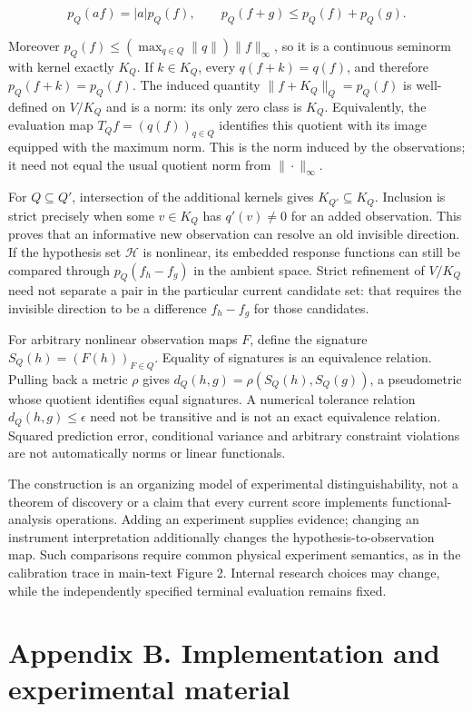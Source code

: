 \documentclass[11pt,a4paper]{article}
\begin{document}
\[
p_Q(af)=|a|p_Q(f),\qquad p_Q(f+g)\leq p_Q(f)+p_Q(g).
\]


Moreover \(p_Q(f)\leq (\max_{q\in Q}\|q\|)\|f\|_\infty\), so it is a continuous seminorm with kernel exactly \(K_Q\). If \(k\in K_Q\), every \(q(f+k)=q(f)\), and therefore \(p_Q(f+k)=p_Q(f)\). The induced quantity \(\|f+K_Q\|_Q=p_Q(f)\) is well-defined on \(V/K_Q\) and is a norm: its only zero class is \(K_Q\). Equivalently, the evaluation map \(T_Qf=(q(f))_{q\in Q}\) identifies this quotient with its image equipped with the maximum norm. This is the norm induced by the observations; it need not equal the usual quotient norm from \(\|\cdot\|_\infty\).


For \(Q\subseteq Q'\), intersection of the additional kernels gives \(K_{Q'}\subseteq K_Q\). Inclusion is strict precisely when some \(v\in K_Q\) has \(q'(v)\ne0\) for an added observation. This proves that an informative new observation can resolve an old invisible direction. If the hypothesis set \(\mathcal H\) is nonlinear, its embedded response functions can still be compared through \(p_Q(f_h-f_g)\) in the ambient space. Strict refinement of \(V/K_Q\) need not separate a pair in the particular current candidate set: that requires the invisible direction to be a difference \(f_h-f_g\) for those candidates.


For arbitrary nonlinear observation maps \(F\), define the signature \(S_Q(h)=(F(h))_{F\in Q}\). Equality of signatures is an equivalence relation. Pulling back a metric \(\rho\) gives \(d_Q(h,g)=\rho(S_Q(h),S_Q(g))\), a pseudometric whose quotient identifies equal signatures. A numerical tolerance relation \(d_Q(h,g)\leq\epsilon\) need not be transitive and is not an exact equivalence relation. Squared prediction error, conditional variance and arbitrary constraint violations are not automatically norms or linear functionals.


The construction is an organizing model of experimental distinguishability, not a theorem of discovery or a claim that every current score implements functional-analysis operations. Adding an experiment supplies evidence; changing an instrument interpretation additionally changes the hypothesis-to-observation map. Such comparisons require common physical experiment semantics, as in the calibration trace in main-text Figure 2. Internal research choices may change, while the independently specified terminal evaluation remains fixed.


\section*{Appendix B. Implementation and experimental material}
\end{document}
